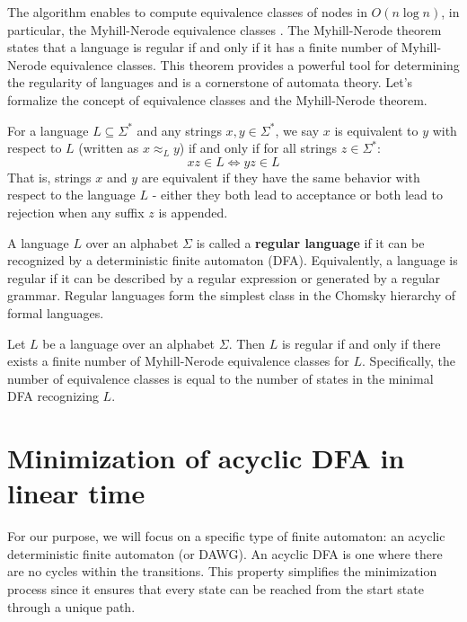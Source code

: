 The algorithm enables to compute equivalence classes of nodes in $O(n\log n)$, in particular, the Myhill-Nerode equivalence classes \cite{nerode1958linear, myhill1957finite}. The Myhill-Nerode theorem states that a language is regular if and only if it has a finite number of Myhill-Nerode equivalence classes. This theorem provides a powerful tool for determining the regularity of languages and is a cornerstone of automata theory. Let's formalize the concept of equivalence classes and the Myhill-Nerode theorem.

\begin{definition}
    For a language $L \subseteq \Sigma^*$ and any strings $x,y \in \Sigma^*$, we say $x$ is equivalent to $y$ with respect to $L$ (written as $x \approx_L y$) if and only if for all strings $z \in \Sigma^*$:
    \[ xz \in L \Leftrightarrow yz \in L \]
    That is, strings $x$ and $y$ are equivalent if they have the same behavior with respect to the language $L$ - either they both lead to acceptance or both lead to rejection when any suffix $z$ is appended.
\end{definition}

\begin{definition}
    A language $L$ over an alphabet $\Sigma$ is called a \textbf{regular language} if it can be recognized by a deterministic finite automaton (DFA). Equivalently, a language is regular if it can be described by a regular expression or generated by a regular grammar. Regular languages form the simplest class in the Chomsky hierarchy of formal languages.
\end{definition}

\begin{theorem} \label{def:myhill-nerode}
    Let $L$ be a language over an alphabet $\Sigma$. Then $L$ is regular if and only if there exists a finite number of Myhill-Nerode equivalence classes for $L$. Specifically, the number of equivalence classes is equal to the number of states in the minimal DFA recognizing $L$.
\end{theorem}

\section{Minimization of acyclic DFA in linear time}
For our purpose, we will focus on a specific type of finite automaton: an acyclic deterministic finite automaton (or DAWG). An acyclic DFA is one where there are no cycles within the transitions. This property simplifies the minimization process since it ensures that every state can be reached from the start state through a unique path.

